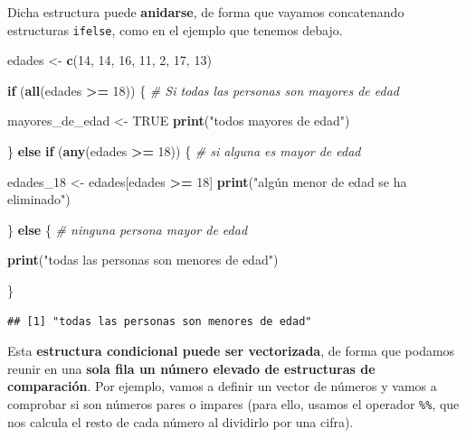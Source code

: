 \documentclass[11pt,]{book}
\newenvironment{Shaded}{\begin{snugshade}}{\end{snugshade}}
\newcommand{\CommentTok}[1]{\textcolor[rgb]{0.37,0.37,0.37}{\textit{#1}}}
\newcommand{\ControlFlowTok}[1]{\textcolor[rgb]{0.27,0.27,0.27}{\textbf{#1}}}
\newcommand{\DecValTok}[1]{\textcolor[rgb]{0.06,0.06,0.06}{#1}}
\newcommand{\KeywordTok}[1]{\textcolor[rgb]{0.27,0.27,0.27}{\textbf{#1}}}
\newcommand{\NormalTok}[1]{#1}
\newcommand{\OperatorTok}[1]{\textcolor[rgb]{0.43,0.43,0.43}{\textbf{#1}}}
\newcommand{\OtherTok}[1]{\textcolor[rgb]{0.37,0.37,0.37}{#1}}
\newcommand{\StringTok}[1]{\textcolor[rgb]{0.5,0.5,0.5}{#1}}
\begin{document}
Dicha estructura puede \textbf{anidarse}, de forma que vayamos concatenando estructuras \texttt{ifelse}, como en el ejemplo que tenemos debajo.

\begin{Shaded}
\begin{Highlighting}[]
\NormalTok{edades <-}\StringTok{ }\KeywordTok{c}\NormalTok{(}\DecValTok{14}\NormalTok{, }\DecValTok{14}\NormalTok{, }\DecValTok{16}\NormalTok{, }\DecValTok{11}\NormalTok{, }\DecValTok{2}\NormalTok{, }\DecValTok{17}\NormalTok{, }\DecValTok{13}\NormalTok{)}

\ControlFlowTok{if}\NormalTok{ (}\KeywordTok{all}\NormalTok{(edades }\OperatorTok{>=}\StringTok{ }\DecValTok{18}\NormalTok{)) \{ }\CommentTok{# Si todas las personas son mayores de edad}
  
\NormalTok{  mayores_de_edad <-}\StringTok{ }\OtherTok{TRUE}
  \KeywordTok{print}\NormalTok{(}\StringTok{"todos mayores de edad"}\NormalTok{)}
  
\NormalTok{\} }\ControlFlowTok{else} \ControlFlowTok{if}\NormalTok{ (}\KeywordTok{any}\NormalTok{(edades }\OperatorTok{>=}\StringTok{ }\DecValTok{18}\NormalTok{)) \{ }\CommentTok{# si alguna es mayor de edad}

\NormalTok{  edades_}\DecValTok{18}\NormalTok{ <-}\StringTok{ }\NormalTok{edades[edades }\OperatorTok{>=}\StringTok{ }\DecValTok{18}\NormalTok{]  }
  \KeywordTok{print}\NormalTok{(}\StringTok{"algún menor de edad se ha eliminado"}\NormalTok{)}
  
\NormalTok{\} }\ControlFlowTok{else}\NormalTok{ \{ }\CommentTok{# ninguna persona mayor de edad}
  
  \KeywordTok{print}\NormalTok{(}\StringTok{"todas las personas son menores de edad"}\NormalTok{)}
  
\NormalTok{\}}
\end{Highlighting}
\end{Shaded}

\begin{verbatim}
## [1] "todas las personas son menores de edad"
\end{verbatim}

Esta \textbf{estructura condicional puede ser vectorizada}, de forma que podamos reunir en una \textbf{sola fila un número elevado de estructuras de comparación}. Por ejemplo, vamos a definir un vector de números y vamos a comprobar si son números pares o impares (para ello, usamos el operador \texttt{\%\%}, que nos calcula el resto de cada número al dividirlo por una cifra).
\end{document}
